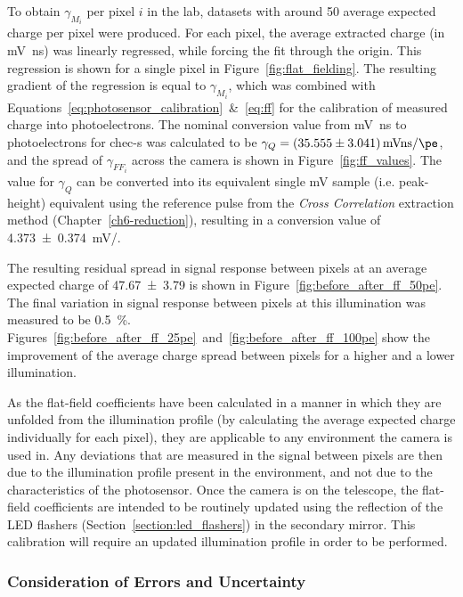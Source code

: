 To obtain $\gamma_{M_i}$ per pixel $i$ in the lab, datasets with around \SI{50}{\pe} average expected charge per pixel were produced. For each pixel, the average extracted charge (in \si{mV ns}) was linearly regressed, while forcing the fit through the origin. This regression is shown for a single pixel in Figure~\ref{fig:flat_fielding}. The resulting gradient of the regression is equal to $\gamma_{M_i}$, which was combined with Equations~\ref{eq:photosensor_calibration}~\&~\ref{eq:ff} for the calibration of measured charge into photoelectrons. The nominal conversion value from \si{mV ns} to photoelectrons for \gls{chec-s} was calculated to be $\gamma_Q = \SI[separate-uncertainty = true]{35.555 \pm 3.041}{mVns/\pe}$, and the spread of $\gamma_{FF_i}$ across the camera is shown in Figure~\ref{fig:ff_values}. The value for $\gamma_Q$ can be converted into its equivalent single \si{mV} sample (i.e. peak-height) equivalent using the reference pulse from the \textit{Cross Correlation} extraction method (Chapter~\ref{ch6-reduction}), resulting in a conversion value of \SI[separate-uncertainty = true]{4.373 \pm 0.374}{mV/\pe}.

The resulting residual spread in signal response between pixels at an average expected charge of \SI[separate-uncertainty = true]{47.67 \pm 3.79}{\pe} is shown in Figure~\ref{fig:before_after_ff_50pe}. The final variation in signal response between pixels at this illumination was measured to be \SI{0.5}{\percent}. Figures~\ref{fig:before_after_ff_25pe}~and~\ref{fig:before_after_ff_100pe} show the improvement of the average charge spread between pixels for a higher and a lower illumination.

As the flat-field coefficients have been calculated in a manner in which they are unfolded from the illumination profile (by calculating the average expected charge individually for each pixel), they are applicable to any environment the camera is used in. Any deviations that are measured in the signal between pixels are then due to the illumination profile present in the environment, and not due to the characteristics of the photosensor. Once the camera is on the telescope, the flat-field coefficients are intended to be routinely updated using the reflection of the LED flashers (Section~\ref{section:led_flashers}) in the secondary mirror. This calibration will require an updated illumination profile in order to be performed.

\subsubsection{Consideration of Errors and Uncertainty}

